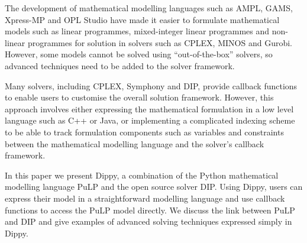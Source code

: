 The development of mathematical modelling languages such as AMPL, GAMS, Xpress-MP and OPL Studio have made it easier to formulate mathematical models such as linear programmes, mixed-integer linear programmes and non-linear programmes for solution in solvers such as CPLEX, MINOS and Gurobi. However, some models cannot be solved using ``out-of-the-box'' solvers, so advanced techniques need to be added to the solver framework.

Many solvers, including CPLEX, Symphony and DIP, provide callback functions to enable users to customise the overall solution framework. However, this approach involves either expressing the mathematical formulation in a low level language such as C++ or Java, or implementing a complicated indexing scheme to be able to track formulation components such as variables and constraints between the mathematical modelling language and the solver's callback framework.

In this paper we present Dippy, a combination of the Python mathematical modelling language PuLP and the open source solver DIP. Using Dippy, users can express their model in a straightforward modelling language and use callback functions to access the PuLP model directly. We discuss the link between PuLP and DIP and give examples of advanced solving techniques expressed simply in Dippy.
